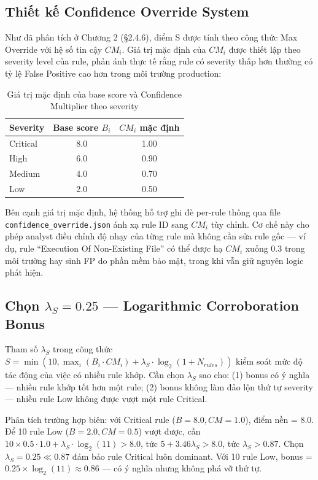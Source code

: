 \documentclass[../main.tex]{subfiles}
\begin{document}
\subsection{Thiết kế Confidence Override System}
\label{subsection:3.4.1}

Như đã phân tích ở Chương 2 (§2.4.6), điểm S được tính theo công thức Max Override với hệ số tin cậy $CM_i$. Giá trị mặc định của $CM_i$ được thiết lập theo severity level của rule, phản ánh thực tế rằng rule có severity thấp hơn thường có tỷ lệ False Positive cao hơn trong môi trường production:

\begin{table}[h]
\centering
\begin{tabular}{|l|c|c|}
\hline
\textbf{Severity} & \textbf{Base score $B_i$} & \textbf{$CM_i$ mặc định} \\ \hline
Critical & 8.0 & 1.00 \\ \hline
High     & 6.0 & 0.90 \\ \hline
Medium   & 4.0 & 0.70 \\ \hline
Low      & 2.0 & 0.50 \\ \hline
\end{tabular}
\caption{Giá trị mặc định của base score và Confidence Multiplier theo severity}
\label{tab:sigma_defaults}
\end{table}

Bên cạnh giá trị mặc định, hệ thống hỗ trợ ghi đè per-rule thông qua file \texttt{confidence\_override.json} ánh xạ rule ID sang $CM_i$ tùy chỉnh. Cơ chế này cho phép analyst điều chỉnh độ nhạy của từng rule mà không cần sửa rule gốc — ví dụ, rule ``Execution Of Non-Existing File'' có thể được hạ $CM_i$ xuống 0.3 trong môi trường hay sinh FP do phần mềm bảo mật, trong khi vẫn giữ nguyên logic phát hiện.

\subsection{Chọn $\lambda_S = 0.25$ — Logarithmic Corroboration Bonus}
\label{subsection:3.4.2}

Tham số $\lambda_S$ trong công thức $S = \min(10, \max_i(B_i \cdot CM_i) + \lambda_S \cdot \log_2(1 + N_{rules}))$ kiểm soát mức độ tác động của việc có nhiều rule khớp. Cần chọn $\lambda_S$ sao cho: (1) bonus có ý nghĩa — nhiều rule khớp tốt hơn một rule; (2) bonus không làm đảo lộn thứ tự severity — nhiều rule Low không được vượt một rule Critical.

Phân tích trường hợp biên: với Critical rule ($B = 8.0, CM = 1.0$), điểm nền = 8.0. Để 10 rule Low ($B = 2.0, CM = 0.5$) vượt được, cần $10 \times 0.5 \cdot 1.0 + \lambda_S \cdot \log_2(11) > 8.0$, tức $5 + 3.46\lambda_S > 8.0$, tức $\lambda_S > 0.87$. Chọn $\lambda_S = 0.25 \ll 0.87$ đảm bảo rule Critical luôn dominant. Với 10 rule Low, bonus = $0.25 \times \log_2(11) \approx 0.86$ — có ý nghĩa nhưng không phá vỡ thứ tự.
\end{document}
